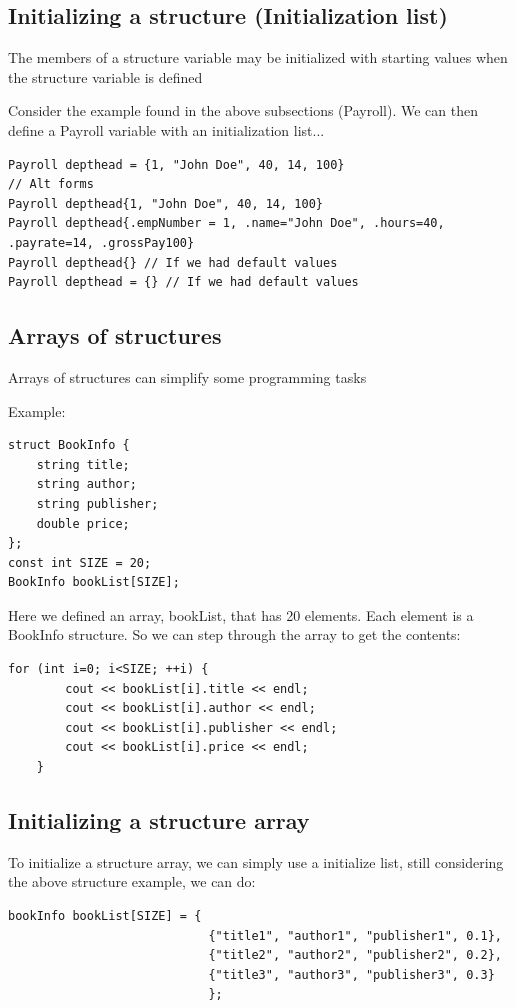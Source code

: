 \documentclass{report}
\begin{document}
	\bigbreak \noindent 
	\subsection{Initializing a structure (Initialization list)}
	\bigbreak \noindent 
	\begin{concept}
	   The members of a structure variable may be initialized with starting values when the structure variable is defined 
	\end{concept}
	\bigbreak \noindent 
	Consider the example found in the above subsections (Payroll). We can then define a Payroll variable with an initialization list...
	\bigbreak \noindent 
	\sepline
	\begin{verbatim}
Payroll depthead = {1, "John Doe", 40, 14, 100}
// Alt forms
Payroll depthead{1, "John Doe", 40, 14, 100} 
Payroll depthead{.empNumber = 1, .name="John Doe", .hours=40, .payrate=14, .grossPay100}
Payroll depthead{} // If we had default values
Payroll depthead = {} // If we had default values
	\end{verbatim}
	\sepline

	\pagebreak \bigbreak \noindent 
	\subsection{Arrays of structures}
	\bigbreak \noindent 
	\begin{concept}
	   Arrays of structures can simplify some programming tasks 
	\end{concept}
	\bigbreak \noindent 
	Example:
	\bigbreak \noindent 
	\sepline
	\begin{verbatim}
struct BookInfo {
    string title;
    string author;
    string publisher;
    double price;
};
const int SIZE = 20;
BookInfo bookList[SIZE];
	\end{verbatim}
	\sepline
	\bigbreak \noindent 
	Here we defined an array, bookList, that has 20 elements. Each element is a BookInfo structure.
	\bigbreak \noindent 
	So we can step through the array to get the contents:
	\bigbreak \noindent 
	\sepline
	\begin{verbatim}
for (int i=0; i<SIZE; ++i) {
        cout << bookList[i].title << endl;
        cout << bookList[i].author << endl;
        cout << bookList[i].publisher << endl;
        cout << bookList[i].price << endl;
    }
	\end{verbatim}
	\sepline
	\bigbreak \noindent 
	\subsection{Initializing a structure array}
	\bigbreak \noindent 
	To initialize a structure array, we can simply use a initialize list, still considering the above structure example, we can do:
	\bigbreak \noindent 
	\sepline
	\begin{verbatim}
bookInfo bookList[SIZE] = {
                            {"title1", "author1", "publisher1", 0.1},
                            {"title2", "author2", "publisher2", 0.2},
                            {"title3", "author3", "publisher3", 0.3}
                            };
	\end{verbatim}
	\sepline
	\bigbreak \noindent 
\end{document}
